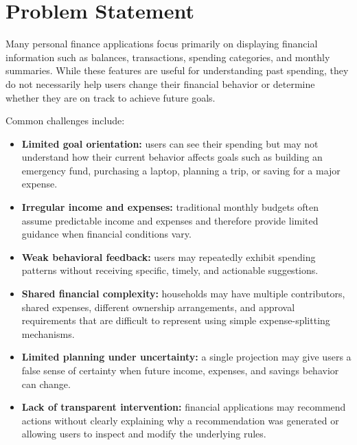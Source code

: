 \documentclass[11pt,a4paper]{article}
\begin{document}
\section{Problem Statement}

Many personal finance applications focus primarily on displaying financial
information such as balances, transactions, spending categories, and monthly
summaries. While these features are useful for understanding past spending,
they do not necessarily help users change their financial behavior or determine
whether they are on track to achieve future goals.

Common challenges include:

\begin{itemize}[leftmargin=0.7cm]
    \item \textbf{Limited goal orientation:} users can see their spending but
    may not understand how their current behavior affects goals such as
    building an emergency fund, purchasing a laptop, planning a trip, or
    saving for a major expense.
    
    \item \textbf{Irregular income and expenses:} traditional monthly budgets
    often assume predictable income and expenses and therefore provide limited
    guidance when financial conditions vary.
    
    \item \textbf{Weak behavioral feedback:} users may repeatedly exhibit
    spending patterns without receiving specific, timely, and actionable
    suggestions.
    
    \item \textbf{Shared financial complexity:} households may have multiple
    contributors, shared expenses, different ownership arrangements, and
    approval requirements that are difficult to represent using simple
    expense-splitting mechanisms.
    
    \item \textbf{Limited planning under uncertainty:} a single projection may
    give users a false sense of certainty when future income, expenses, and
    savings behavior can change.
    
    \item \textbf{Lack of transparent intervention:} financial applications
    may recommend actions without clearly explaining why a recommendation was
    generated or allowing users to inspect and modify the underlying rules.
\end{itemize}
\end{document}
